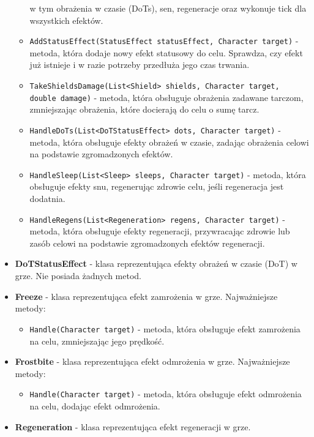 \begin{itemize}
\begin{itemize}
                w tym obrażenia w czasie (DoTs), sen, regeneracje oraz wykonuje tick dla wszystkich efektów.
                \item \texttt{AddStatusEffect(StatusEffect statusEffect, Character target)} - metoda, która dodaje nowy efekt statusowy do celu. 
                Sprawdza, czy efekt już istnieje i w razie potrzeby przedłuża jego czas trwania.
                \item \texttt{TakeShieldsDamage(List<Shield> shields, Character target, double damage)} - metoda, która obsługuje obrażenia zadawane tarczom, 
                zmniejszając obrażenia, które docierają do celu o sumę tarcz.
                \item \texttt{HandleDoTs(List<DoTStatusEffect> dots, Character target)} - metoda, która obsługuje efekty obrażeń w czasie, 
                zadając obrażenia celowi na podstawie zgromadzonych efektów.
                \item \texttt{HandleSleep(List<Sleep> sleeps, Character target)} - metoda, która obsługuje efekty snu, regenerując zdrowie celu, 
                jeśli regeneracja jest dodatnia.
                \item \texttt{HandleRegens(List<Regeneration> regens, Character target)} - metoda, która obsługuje efekty regeneracji, 
                przywracając zdrowie lub zasób celowi na podstawie zgromadzonych efektów regeneracji.
            \end{itemize}
        \item \textbf{DoTStatusEffect} - klasa reprezentująca efekty obrażeń w czasie (DoT) w grze. Nie posiada żadnych metod.
        \item \textbf{Freeze} - klasa reprezentująca efekt zamrożenia w grze. Najważniejsze metody:
            \begin{itemize}
                \item \texttt{Handle(Character target)} - metoda, która obsługuje efekt zamrożenia na celu, zmniejszając jego prędkość.
            \end{itemize}
        \item \textbf{Frostbite} - klasa reprezentująca efekt odmrożenia w grze. Najważniejsze metody:
            \begin{itemize}
                \item \texttt{Handle(Character target)} - metoda, która obsługuje efekt odmrożenia na celu, dodając efekt odmrożenia.
            \end{itemize}
        \item \textbf{Regeneration} - klasa reprezentująca efekt regeneracji w grze. 

\end{itemize}
